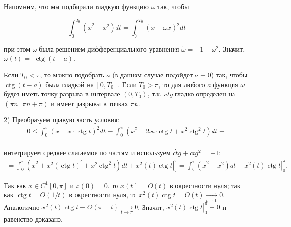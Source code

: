 \begin{task}
Напомним, что мы подбирали гладкую функцию $\omega$ так, чтобы

$$
\int_{0}^{T_{0}}\left(\dot{x}^{2}-x^{2}\right) d t=\int_{0}^{T_{0}}(\dot{x}-\omega x)^{2} d t
$$

при этом $\omega$ была решением дифференциального уравнения $\dot{\omega}=-1-\omega^{2}$. Значит, $\omega(t)=$ $\operatorname{ctg}(t-a)$.

Если $T_{0}<\pi$, то можно подобрать $a$ (в данном случае подойдет $a = 0$) так, чтобы $\operatorname{ctg}(t-a)$ была гладкой на $\left[0, T_{0}\right]$. Если $T_{0}>\pi$, то для любого $a$ функция $\omega$ будет иметь точку разрыва в интервале $\left(0, T_{0}\right)$, т.к. $ctg$ гладко определен на $(\pi n ,\ \pi n + \pi)$ и имеет разрывы в точках $\pi n$.

2) Преобразуем правую часть условия:
$$
\begin{gathered}
0 \leq\int_{0}^{\pi}(\dot{x}-x \cdot \operatorname{ctg} t)^{2} d t=\int_{0}^{\pi}\left(\dot{x}^{2}-2 x \dot{x} \operatorname{ctg} t+x^{2} \operatorname{ctg}^{2} t\right) d t= 
\end{gathered}
$$\\
интегрируем среднее слагаемое по частям и используем $\dot{ctg}+ctg^{2}=-1$:
$$
\begin{gathered}
=\int_{0}^{\pi}\left(\dot{x}^{2}+x^{2}(\operatorname{ctg} t)^{\prime}+x^{2} \operatorname{ctg}^{2} t\right) d t+\left.x^{2}(t) \operatorname{ctg} t\right|_{0} ^{\pi}=\int_{0}^{\pi}\left(\dot{x}^{2}-x^{2}\right) d t+\left.x^{2}(t) \operatorname{ctg} t\right|_{0} ^{\pi} .
\end{gathered}
$$

Так как $x \in C^{1}[0, \pi]$ и $x(0)=0$, то $x(t)=O(t)$ в окрестности нуля; так как $\operatorname{ctg} t=O(1 / t)$ в окрестности нуля, то $x^{2}(t) \operatorname{ctg} t=O(t) \underset{t \rightarrow 0}{\rightarrow} 0$. Аналогично $x^{2}(t) \operatorname{ctg} t=O(\pi-t) \underset{t \rightarrow \pi}{\rightarrow} 0$. Значит, $\left.x^{2}(t) \operatorname{ctg} t\right|_{0} ^{\pi}=0$ и равенство доказано.

\end{task}
